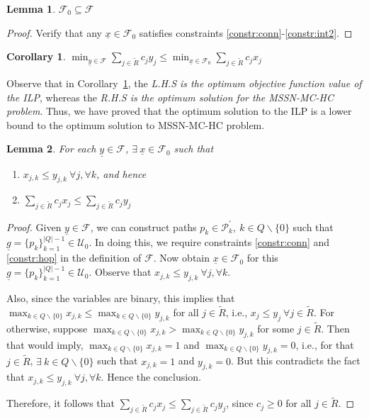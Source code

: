 \documentclass[conference]{IEEEtran}
\newcommand{\Rt}{\tilde{R}}
\newcommand{\F}{\mathcal{F}}
\newcommand{\U}{\mathcal{U}}
\renewcommand{\P}{\mathcal{P}}
\newtheorem{lemma}{Lemma}
\newtheorem{corollary}{Corollary}
\begin{document}
\begin{lemma}
$\F_0\subseteq \F$
\end{lemma}
\begin{proof}
Verify that any $\underline{x}\in \F_0$ satisfies constraints \eqref{constr:conn}-\eqref{constr:int2}.
\end{proof}

\begin{corollary}
\label{cor:ilpcor1}
$\min_{\underline{y}\in\F}\sum_{j\in \Rt}c_jy_j\leq \min_{\underline{x}\in\F_0}\sum_{j\in \Rt}c_jx_j$
\end{corollary}

Observe that in Corollary~\ref{cor:ilpcor1}, the \emph{L.H.S is the optimum objective function value of the ILP}, whereas the \emph{R.H.S is the optimum solution for the MSSN-MC-HC problem}. Thus, we have proved that the optimum solution to the ILP is a lower bound to the optimum solution to MSSN-MC-HC problem.

\begin{lemma}
For each $\underline{y}\in\F$, $\exists \:\underline{x}\in\F_0$ such that 
\begin{enumerate}
\item $x_{j,k}\leq y_{j,k}\:\forall j,\forall k$, and hence
\item $\sum_{j\in \Rt}c_jx_j\leq \sum_{j\in \Rt}c_jy_j$
\end{enumerate}
\end{lemma}

\begin{proof}
Given $\underline{y}\in \F$, we can construct paths $p_k\in\P_k^{'},\:k\in Q\backslash\{0\}$ such that $\underline{g}=\{p_k\}_{k=1}^{|Q|-1}\in \U_0$. In doing this, we require constraints \eqref{constr:conn} and \eqref{constr:hop} in the definition of $\F$. Now obtain $\underline{x}\in \F_0$ for this $\underline{g}=\{p_k\}_{k=1}^{|Q|-1}\in \U_0$. Observe that $x_{j,k}\leq y_{j,k}\:\forall j,\forall k$.

Also, since the variables are binary, this implies that $\max_{k\in Q\backslash\{0\}}x_{j,k}\leq \max_{k\in Q\backslash\{0\}}y_{j,k}$ for all $j\in \Rt$, i.e., $x_j\leq y_j\:\forall j\in \Rt$. For otherwise, suppose $\max_{k\in Q\backslash\{0\}}x_{j,k} > \max_{k\in Q\backslash\{0\}}y_{j,k}$ for some $j\in \Rt$. Then that would imply, $\max_{k\in Q\backslash\{0\}}x_{j,k}=1$ and $\max_{k\in Q\backslash\{0\}}y_{j,k}=0$, i.e., for that $j\in \Rt$, $\exists \:k\in Q\backslash\{0\}$ such that $x_{j,k}=1$ and $y_{j,k}=0$. But this contradicts the fact that $x_{j,k}\leq y_{j,k}\:\forall j,\forall k$. Hence the conclusion.

Therefore, it follows that $\sum_{j\in \Rt}c_jx_j\leq \sum_{j\in \Rt}c_jy_j$, since $c_j\geq 0$ for all $j\in\Rt$.  
\end{proof} 
\end{document}

